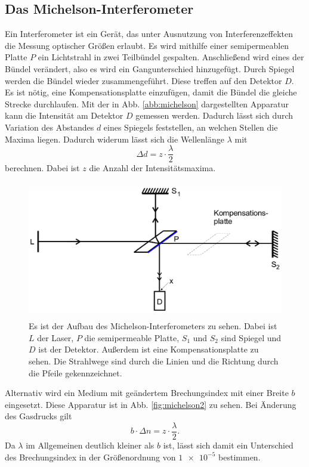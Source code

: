 \subsection{Das Michelson-Interferometer}
Ein Interferometer ist ein Gerät, das unter Ausnutzung von Interferenzeffekten die 
Messung optischer Größen erlaubt. 
Es wird mithilfe einer semipermeablen Platte $P$ ein Lichtstrahl in zwei Teilbündel 
gespalten. Anschließend wird eines der Bündel verändert, also es wird ein Gangunterschied hinzugefügt. Durch Spiegel werden die Bündel wieder zusammengeführt. Diese treffen auf den Detektor $D$.
Es ist nötig, eine Kompensationsplatte einzufügen, damit die Bündel die gleiche Strecke
durchlaufen.
Mit der in Abb. \ref{abb:michelson} dargestellten Apparatur kann die Intensität am 
Detektor $D$ gemessen werden. Dadurch lässt sich durch Variation des Abstandes $d$ eines Spiegels feststellen, an welchen Stellen die Maxima liegen. Dadurch widerum lässt sich die 
Wellenlänge $\lambda$ mit 
\begin{equation}
    \Delta d = z \cdot \frac{\lambda}{2}
    \label{eqn:lambda}
\end{equation}
berechnen. Dabei ist $z$ die Anzahl der Intensitätsmaxima.

\begin{figure}
    \centering
    \includegraphics[width=12cm, height=6cm]{build/michelson.png}
    \caption{Es ist der Aufbau des Michelson-Interferometers zu sehen. Dabei ist $L$ der Laser, $P$ die semipermeable Platte, $S_1$ und $S_2$ sind Spiegel und $D$ ist der Detektor. Außerdem ist eine Kompensationsplatte zu sehen. Die Strahlwege sind durch die Linien und die Richtung durch die Pfeile gekennzeichnet. \cite{V401}}
    \label{fig:michelson}
\end{figure}

\noindent Alternativ wird ein Medium mit geändertem Brechungsindex mit einer Breite $b$ eingesetzt.
Diese Apparatur ist in Abb. \ref{fig:michelson2} zu sehen.
Bei Änderung des Gasdrucks gilt
\begin{equation}
    b \cdot \Delta n = z \cdot \frac{\lambda}{2}.
    \label{eqn:deltan}
\end{equation}
Da $\lambda$ im Allgemeinen deutlich kleiner als $b$ ist, lässt sich damit ein 
Unterschied des Brechungsindex in der Größenordnung von $\num{1e-5}$ bestimmen.

